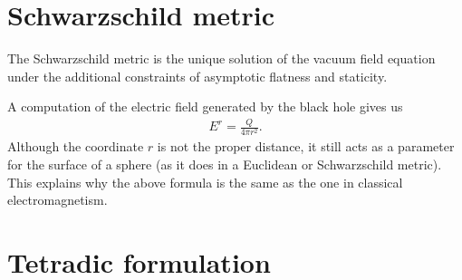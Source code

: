 \section{Schwarzschild metric}


    \begin{theorem}[Birkhoff]
        The Schwarzschild metric is the unique solution of the vacuum field equation under the additional constraints of asymptotic flatness and staticity.
    \end{theorem}


    \begin{remark}
        A computation of the electric field generated by the black hole gives us
        \begin{gather}
            E^r = \frac{Q}{4\pi r^2}.
        \end{gather}
        Although the coordinate $r$ is not the proper distance, it still acts as a parameter for the surface of a sphere (as it does in a Euclidean or Schwarzschild metric). This explains why the above formula is the same as the one in classical electromagnetism.
    \end{remark}

\section{Tetradic formulation}

